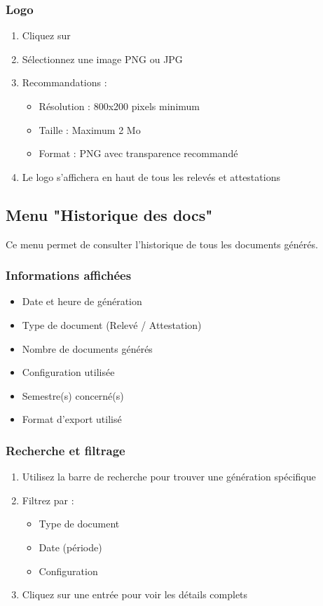 \subsubsection{Logo}

\begin{enumerate}[leftmargin=*]
    \item Cliquez sur 
    \item Sélectionnez une image PNG ou JPG
    \item Recommandations :
    \begin{itemize}
        \item Résolution : 800x200 pixels minimum
        \item Taille : Maximum 2 Mo
        \item Format : PNG avec transparence recommandé
    \end{itemize}
    \item Le logo s'affichera en haut de tous les relevés et attestations
\end{enumerate}

\subsection{Menu "Historique des docs"}

Ce menu permet de consulter l'historique de tous les documents générés.

\subsubsection{Informations affichées}

\begin{itemize}[leftmargin=*]
    \item Date et heure de génération
    \item Type de document (Relevé / Attestation)
    \item Nombre de documents générés
    \item Configuration utilisée
    \item Semestre(s) concerné(s)
    \item Format d'export utilisé
\end{itemize}

\subsubsection{Recherche et filtrage}

\begin{enumerate}[leftmargin=*]
    \item Utilisez la barre de recherche pour trouver une génération spécifique
    \item Filtrez par :
    \begin{itemize}
        \item Type de document
        \item Date (période)
        \item Configuration
    \end{itemize}
    \item Cliquez sur une entrée pour voir les détails complets
\end{enumerate}

